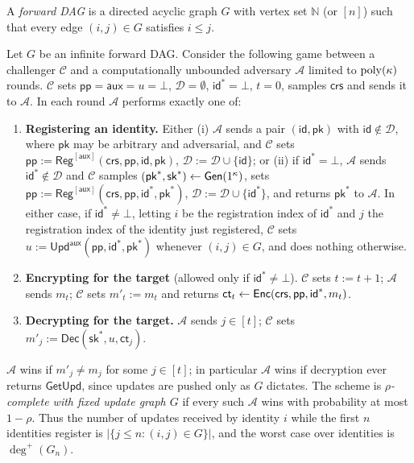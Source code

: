 \documentclass{aicr-conjecture}
\newcommand{\Gen}{\mathsf{Gen}}
\newcommand{\Reg}{\mathsf{Reg}}
\newcommand{\Enc}{\mathsf{Enc}}
\newcommand{\Upd}{\mathsf{Upd}}
\newcommand{\Dec}{\mathsf{Dec}}
\newcommand{\pp}{\mathsf{pp}}
\newcommand{\aux}{\mathsf{aux}}
\newcommand{\crs}{\mathsf{crs}}
\newcommand{\pk}{\mathsf{pk}}
\newcommand{\sk}{\mathsf{sk}}
\newcommand{\id}{\mathsf{id}}
\newcommand{\ct}{\mathsf{ct}}
\newcommand{\GetUpd}{\mathsf{GetUpd}}
\newcommand{\Nat}{\mathbb{N}}
\newcommand{\outdeg}{\deg^{+}}
\begin{document}
\begin{definition}\label{def:dag}
A \emph{forward DAG} is a directed acyclic graph $G$ with vertex set
$\Nat$ (or $[n]$) such that every edge $(i,j) \in G$ satisfies
$i \le j$.
\end{definition}

\begin{definition}\label{def:comp2}
Let $G$ be an infinite forward DAG. Consider the following game between
a challenger $\mathcal{C}$ and a computationally unbounded adversary
$\mathcal{A}$ limited to $\mathrm{poly}(\kappa)$ rounds. $\mathcal{C}$ sets
$\pp = \aux = u = \bot$, $\mathcal{D} = \emptyset$, $\id^{*} = \bot$,
$t = 0$, samples $\crs$ and sends it to $\mathcal{A}$. In each round
$\mathcal{A}$ performs exactly one of:
\begin{enumerate}
  \item \textbf{Registering an identity.} Either (i) $\mathcal{A}$ sends
    a pair $(\id,\pk)$ with $\id \notin \mathcal{D}$, where $\pk$ may be
    arbitrary and adversarial, and $\mathcal{C}$ sets
    $\pp := \Reg^{[\aux]}(\crs,\pp,\id,\pk)$,
    $\mathcal{D} := \mathcal{D}\cup\{\id\}$; or (ii) if
    $\id^{*} = \bot$, $\mathcal{A}$ sends $\id^{*} \notin \mathcal{D}$
    and $\mathcal{C}$ samples $(\pk^{*},\sk^{*}) \sample
    \Gen(1^{\kappa})$, sets
    $\pp := \Reg^{[\aux]}(\crs,\pp,\id^{*},\pk^{*})$,
    $\mathcal{D} := \mathcal{D}\cup\{\id^{*}\}$, and returns $\pk^{*}$
    to $\mathcal{A}$. In either case, if $\id^{*} \neq \bot$, letting
    $i$ be the registration index of $\id^{*}$ and $j$ the registration
    index of the identity just registered, $\mathcal{C}$ sets
    $u := \Upd^{\aux}(\pp,\id^{*},\pk^{*})$ whenever $(i,j) \in G$, and
    does nothing otherwise.
  \item \textbf{Encrypting for the target} (allowed only if
    $\id^{*} \neq \bot$). $\mathcal{C}$ sets $t := t+1$; $\mathcal{A}$
    sends $m_t$; $\mathcal{C}$ sets $m'_t := m_t$ and returns
    $\ct_t \sample \Enc(\crs,\pp,\id^{*},m_t)$.
  \item \textbf{Decrypting for the target.} $\mathcal{A}$ sends
    $j \in [t]$; $\mathcal{C}$ sets $m'_j := \Dec(\sk^{*},u,\ct_j)$.
\end{enumerate}
$\mathcal{A}$ wins if $m'_j \neq m_j$ for some $j \in [t]$; in
particular $\mathcal{A}$ wins if decryption ever returns $\GetUpd$,
since updates are pushed only as $G$ dictates. The scheme is
\emph{$\rho$-complete with fixed update graph $G$} if every such
$\mathcal{A}$ wins with probability at most $1-\rho$. Thus the number of
updates received by identity $i$ while the first $n$ identities register
is $|\{j \le n : (i,j) \in G\}|$, and the worst case over identities is
$\outdeg(G_n)$.
\end{definition}
\end{document}

